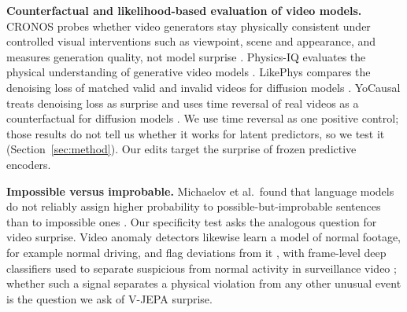 \textbf{Counterfactual and likelihood-based evaluation of video models.} CRONOS probes whether video generators stay physically consistent under controlled visual interventions such as viewpoint, scene and appearance, and measures generation quality, not model surprise \cite{begiristain2026}. Physics-IQ evaluates the physical understanding of generative video models \cite{motamed2025}. LikePhys compares the denoising loss of matched valid and invalid videos for diffusion models \cite{likephys2025}. YoCausal treats denoising loss as surprise and uses time reversal of real videos as a counterfactual for diffusion models \cite{yocausal2026}. We use time reversal as one positive control; those results do not tell us whether it works for latent predictors, so we test it (Section~\ref{sec:method}). Our edits target the surprise of frozen predictive encoders.

\textbf{Impossible versus improbable.} Michaelov et al.\ found that language models do not reliably assign higher probability to possible-but-improbable sentences than to impossible ones \cite{michaelov2025}. Our specificity test asks the analogous question for video surprise. Video anomaly detectors likewise learn a model of normal footage, for example normal driving, and flag deviations from it \cite{kandacharam2025}, with frame-level deep classifiers used to separate suspicious from normal activity in surveillance video \cite{amrutha2020}; whether such a signal separates a physical violation from any other unusual event is the question we ask of V-JEPA surprise.
